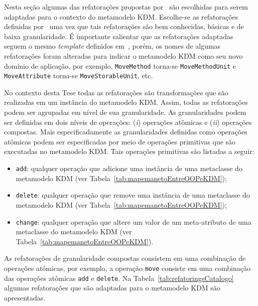 Nesta seção algumas das refatorações propostas por~ são escolhidas para serem adaptadas para o contexto do metamodelo KDM. Escolhe-se as refatorações definidas por~ uma vez que tais refatorações são bem conhecidas, básicas e de baixa granularidade. É importante salientar que as refatorações adaptadas seguem o mesmo \textit{template} definidos em~, porém, os nomes de algumas refatorações foram alteradas para indicar o metamodelo KDM como seu novo domínio de aplicação, por exemplo, \texttt{MoveMethod} torna-se \texttt{MoveMethodUnit} e \texttt{MoveAttribute} torna-se \texttt{MoveStorableUnit}, etc. 

No contexto desta Tese todas as refatorações são transformações que são realizadas em um instância do metamodelo KDM. Assim, todas as refatorações podem ser agrupadas em nível de sua granularidade. As granularidades podem ser definidas em dois níveis de operações: (\textit{i}) operações atômicas e (\textit{ii}) operações compostas. Mais especificadamente as granularidades definidas como operações atômicas podem ser especificadas por meio de operações primitivas que são executadas no metamodelo KDM. Tais operações primitivas são listadas a seguir:

\begin{itemize}
\item \texttt{add}: qualquer operação que adicione uma instância de uma metaclasse do metamodelo KDM (ver Tabela~\ref{tab:mapemanetoEntreOOPeKDM});
\item \texttt{delete}: qualquer operação que remove uma instância de uma metaclasse do metamodelo KDM (ver Tabela~\ref{tab:mapemanetoEntreOOPeKDM});
\item \texttt{change}: qualquer operação que altere um valor de um meta-atributo de uma metaclasse do metamodelo KDM (ver Tabela~\ref{tab:mapemanetoEntreOOPeKDM}).
\end{itemize}

As refatorações de granularidade compostas consistem em uma combinação de operações atômicas, por exemplo, a operação \texttt{move} consiste em uma combinação das operações atômicas \texttt{add} e \texttt{delete}. Na Tabela~\ref{tab:refatoringsCatalogo} algumas refatorações que são adaptadas para o metamodelo KDM são apresentadas. %

